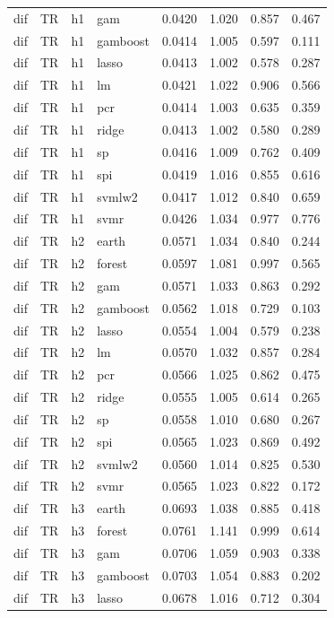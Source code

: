 \begin{ThreePartTable}
\begin{longtable}[t]{llclcccc}
dif & TR & h1 & gam & 0.0420 & 1.020 & 0.857 & 0.467\\
dif & TR & h1 & gamboost & 0.0414 & 1.005 & 0.597 & 0.111\\
dif & TR & h1 & lasso & 0.0413 & 1.002 & 0.578 & 0.287\\
dif & TR & h1 & lm & 0.0421 & 1.022 & 0.906 & 0.566\\
dif & TR & h1 & pcr & 0.0414 & 1.003 & 0.635 & 0.359\\
dif & TR & h1 & ridge & 0.0413 & 1.002 & 0.580 & 0.289\\
dif & TR & h1 & sp & 0.0416 & 1.009 & 0.762 & 0.409\\
dif & TR & h1 & spi & 0.0419 & 1.016 & 0.855 & 0.616\\
dif & TR & h1 & svmlw2 & 0.0417 & 1.012 & 0.840 & 0.659\\
dif & TR & h1 & svmr & 0.0426 & 1.034 & 0.977 & 0.776\\
\addlinespace
dif & TR & h2 & earth & 0.0571 & 1.034 & 0.840 & 0.244\\
dif & TR & h2 & forest & 0.0597 & 1.081 & 0.997 & 0.565\\
dif & TR & h2 & gam & 0.0571 & 1.033 & 0.863 & 0.292\\
dif & TR & h2 & gamboost & 0.0562 & 1.018 & 0.729 & 0.103\\
dif & TR & h2 & lasso & 0.0554 & 1.004 & 0.579 & 0.238\\
dif & TR & h2 & lm & 0.0570 & 1.032 & 0.857 & 0.284\\
dif & TR & h2 & pcr & 0.0566 & 1.025 & 0.862 & 0.475\\
dif & TR & h2 & ridge & 0.0555 & 1.005 & 0.614 & 0.265\\
dif & TR & h2 & sp & 0.0558 & 1.010 & 0.680 & 0.267\\
dif & TR & h2 & spi & 0.0565 & 1.023 & 0.869 & 0.492\\
dif & TR & h2 & svmlw2 & 0.0560 & 1.014 & 0.825 & 0.530\\
dif & TR & h2 & svmr & 0.0565 & 1.023 & 0.822 & 0.172\\
\addlinespace
dif & TR & h3 & earth & 0.0693 & 1.038 & 0.885 & 0.418\\
dif & TR & h3 & forest & 0.0761 & 1.141 & 0.999 & 0.614\\
dif & TR & h3 & gam & 0.0706 & 1.059 & 0.903 & 0.338\\
dif & TR & h3 & gamboost & 0.0703 & 1.054 & 0.883 & 0.202\\
dif & TR & h3 & lasso & 0.0678 & 1.016 & 0.712 & 0.304\\

\end{longtable}
\end{ThreePartTable}

